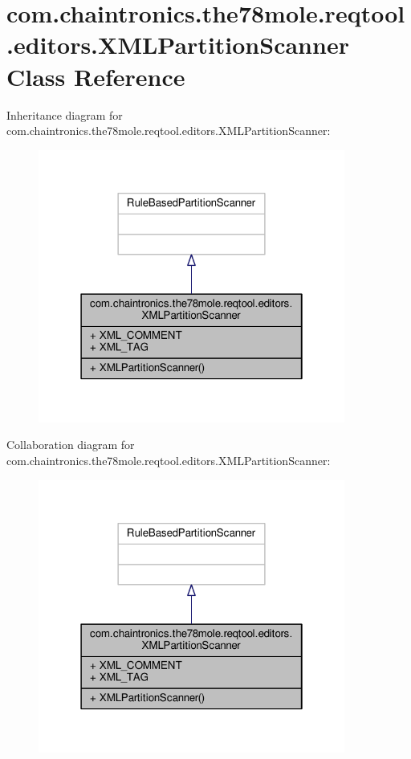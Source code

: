 \hypertarget{classcom_1_1chaintronics_1_1the78mole_1_1reqtool_1_1editors_1_1XMLPartitionScanner}{}\section{com.\+chaintronics.\+the78mole.\+reqtool.\+editors.\+X\+M\+L\+Partition\+Scanner Class Reference}
\label{classcom_1_1chaintronics_1_1the78mole_1_1reqtool_1_1editors_1_1XMLPartitionScanner}


Inheritance diagram for com.\+chaintronics.\+the78mole.\+reqtool.\+editors.\+X\+M\+L\+Partition\+Scanner\+:\nopagebreak
\begin{figure}[H]
\begin{center}
\leavevmode
\includegraphics[width=286pt]{de/d1e/classcom_1_1chaintronics_1_1the78mole_1_1reqtool_1_1editors_1_1XMLPartitionScanner__inherit__graph}
\end{center}
\end{figure}


Collaboration diagram for com.\+chaintronics.\+the78mole.\+reqtool.\+editors.\+X\+M\+L\+Partition\+Scanner\+:\nopagebreak
\begin{figure}[H]
\begin{center}
\leavevmode
\includegraphics[width=286pt]{d9/d11/classcom_1_1chaintronics_1_1the78mole_1_1reqtool_1_1editors_1_1XMLPartitionScanner__coll__graph}
\end{center}
\end{figure}
